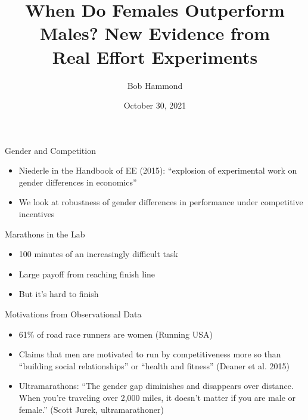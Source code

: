 \documentclass[14pt]{beamer}
\title[Gender, Competition, and Marathons in the Lab]{When Do Females Outperform Males? New Evidence from \\ Real Effort Experiments}
\author[Hammond, Masclet, and Penard]{Bob Hammond}
\institute[]{University of Alabama\\
\bigskip
(with David Masclet and Thierry Penard)}
\date{October 30, 2021}
\begin{document}
\begin{frame}
  \titlepage
\end{frame}

\begin{frame}{Gender and Competition}
\begin{itemize}
	\item Niederle in the Handbook of EE (2015): ``explosion of experimental work on gender differences in economics''
	\item We look at robustness of gender differences in performance under competitive incentives
\end{itemize}
\end{frame}

\begin{frame}{Marathons in the Lab}
\begin{itemize}
	\item 100 minutes of an increasingly difficult task
	\item Large payoff from reaching finish line
	\item But it's hard to finish
\end{itemize}
\end{frame}

\begin{frame}{Motivations from Observational Data}
\begin{itemize}
	\item 61\% of road race runners are women (Running USA)
	\item Claims that men are motivated to run by competitiveness more so than ``building social relationships'' or ``health and fitness''	(Deaner et al. 2015)
	\item Ultramarathons: ``The gender gap diminishes and disappears over distance. When you're traveling over 2,000 miles, it doesn't matter if you are male or female.''  (Scott Jurek, ultramarathoner)
\end{itemize}
\end{frame}

\end{document}

